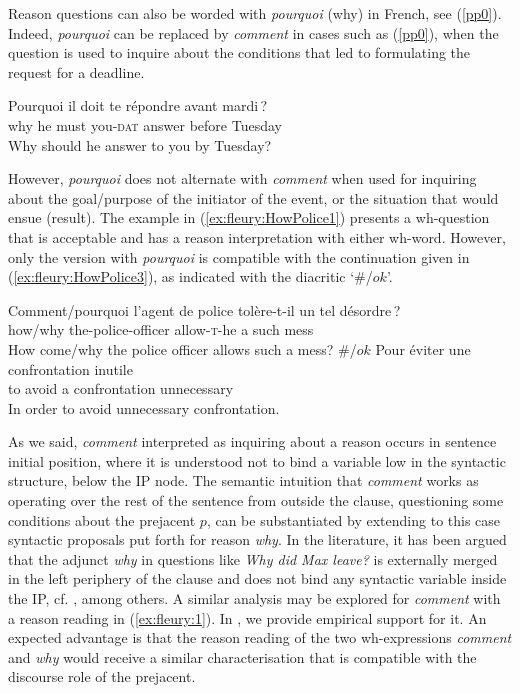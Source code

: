 \documentclass[output=paper,colorlinks,citecolor=brown,
]{langscibook}
\begin{document}
Reason questions can also be worded with \textit{pourquoi} (why)  in French, see (\ref{pp0}). 
Indeed,  \textit{pourquoi} can be replaced by \textit{comment} in cases such as (\ref{pp0}), when the question is used to inquire about the conditions that led to formulating the request for a deadline. 
\begin{exe}
\ex \label{pp0} \gll Pourquoi il doit te r\'epondre avant mardi\,? \\
why he must you-\textsc{dat} answer before Tuesday \\
\glt Why should he answer to you by Tuesday?
\end{exe}
However,  \textit{pourquoi} does not alternate with   \textit{comment}  when used for inquiring about  the goal/purpose  of the initiator of the event, or the situation that would ensue (result). 
The example in (\ref{ex:fleury:HowPolice1}) presents a wh-question that is acceptable and has a reason interpretation with either wh-word. However, only the version with \textit{pourquoi} is compatible with the continuation given in (\ref{ex:fleury:HowPolice3}), as indicated with the diacritic `\#/${ok}$'.
\begin{exe}
\ex \label{ex:fleury:HowPolice0}
\begin{xlist}
\ex \label{ex:fleury:HowPolice1} \gll Comment/pourquoi {l'agent de police} tol\`ere-t-il un tel d\'esordre\,?\\
how/why the-police-officer allow-\textsc{t}-he a such mess \\
\glt How come/why the police officer allows such a mess?
\ex \label{ex:fleury:HowPolice3} \gll \#/${ok}$  Pour \'eviter une confrontation inutile\\
{} to avoid a confrontation unnecessary\\
\glt In order to avoid unnecessary confrontation.
\end{xlist}
\end{exe} 


As we said, \textit{comment\/}   interpreted as inquiring about a reason occurs in sentence initial position, where it is  understood not to bind a variable low in the syntactic structure, below the IP node. 
%
The semantic intuition that \textit{comment} works as operating over  the rest of the sentence from outside the clause,   questioning some conditions about the prejacent  $p$,  can be substantiated by extending to this case syntactic proposals put forth for reason \textit{why}.
In the literature, it has been argued that the adjunct \textit{why}  in questions like \textit{Why did Max leave?} is externally merged in the left periphery of the clause and does not bind any syntactic variable inside the IP, cf.\/ \citep{Rizzi90, Rizzi01}, \citep{ShlonskySoare11} among others. %
A similar 
analysis may be explored for \textit{comment} with a reason reading in  (\ref{ex:fleury:1}).
In , we provide empirical support for it. 
An expected advantage is that the reason reading of the two wh-expressions \textit{comment} and \textit{why}  would receive a similar  characterisation that is compatible with
the discourse role of the prejacent.
\end{document}
